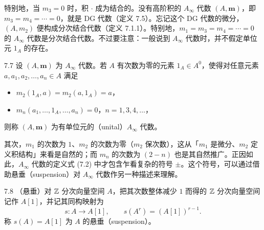 
特别地，当 $m_{3}=0$ 时，积 $\cdot$ 成为结合的。没有高阶积的 $A_\infty$ 代数 $(A,\mathbf m)$，即 $m_{3}=m_{4}=\cdots=0$，就是 DG 代数（定义 7.5）。忘记这个 DG 代数的微分，$(A,m_{2})$ 便构成分次结合代数（定义 7.1.1）。特别地，$m_{1}=m_{3}=m_{4}=\cdots=0$ 的 $A_\infty$ 代数是分次结合代数。不过要注意：一般说到 $A_\infty$ 代数时，并不假定单位元 $1_{A}$ 的存在。


\begin{definition}{7.7}
设 $(A,\mathbf m)$ 为 $A_\infty$ 代数。若 $A$ 有次数为零的元素 $1_{A}\in A^{0}$，使得对任意元素 $a,a_{1},a_{2},\dots,a_{n}\in A$ 满足
\begin{itemize}[leftmargin=1.6em,itemsep=1pt,topsep=1pt]
  \item $m_{2}(1_{A},a)=m_{2}(a,1_{A})=a$，
  \item $m_{n}(a_{1},\dots,1_{A},\dots,a_{n})=0$，\quad $n=1,3,4,\dots$，
\end{itemize}
则称 $(A,\mathbf m)$ 为有单位元的（unital）$A_\infty$ 代数。
\end{definition}


其次，$m_{1}$ 的次数为 $1$、$m_{2}$ 的次数为零（$m_{2}$ 保次数），这从「$m_{1}$ 是微分、$m_{2}$ 定义积结构」来看是自然的；而 $m_{n}$ 的次数为 $(2-n)$ 也是其自然推广。正因如此，$A_\infty$ 代数的定义式 (7.2) 中才包含乍看复杂的符号 $\pm$。这个符号，可以通过借助悬垂（suspension）对 $A_\infty$ 代数作另一种描述来理解。

\begin{definition}{7.8}
（悬垂）对 $\mathbb{Z}$ 分次向量空间 $A$，把其次数整体减少 $1$ 而得的 $\mathbb{Z}$ 分次向量空间记作 $A[1]$，并记其同构映射为
\[
  s\colon A\longrightarrow A[1],\qquad s(A^{r})=(A[1])^{r-1}.
\]
称 $s(A)=A[1]$ 为 $A$ 的悬垂（suspension）。
\end{definition}

